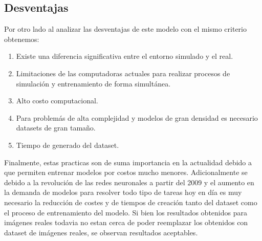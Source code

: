 \documentclass[]{IEEEtran}
\begin{document}
    \subsection{Desventajas}
    
    Por otro lado al analizar las desventajas de este modelo con el mismo criterio obtenemos:
    
    \begin{enumerate}
        \item Existe una diferencia significativa entre el entorno simulado y el real.
        \item Limitaciones de las computadoras actuales para realizar procesos de simulación y entrenamiento de forma simultánea.
        \item Alto costo computacional.
        \item Para problemás de alta complejidad y modelos de gran densidad es necesario datasets de gran tamaño.
        \item Tiempo de generado del dataset.
    \end{enumerate}


    Finalmente, estas practicas son de suma importancia en la actualidad debido a que permiten entrenar modelos por costos mucho menores. 
    Adicionalmente se debido a la revolución de las redes neuronales a partir del 2009 y el aumento en la demanda de modelos para resolver todo 
    tipo de tareas hoy en día es muy necesario la reducción de costes y de tiempos de creación tanto del dataset como el proceso de entrenamiento del modelo. 
    Si bien los resultados obtenidos para imágenes reales todavia no estan cerca de poder reemplazar los obtenidos con dataset de imágenes reales, se 
    observan resultados aceptables.

 
    
    
\end{document}
